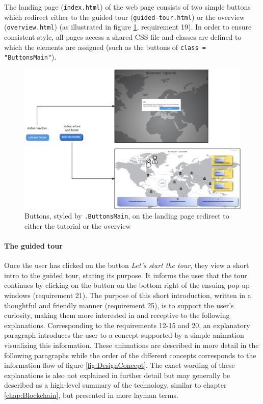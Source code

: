 The landing page (\texttt{index.html}) of the web page consists of two simple buttons which redirect either to the guided tour (\texttt{guided-tour.html}) or the overview (\texttt{overview.html}) (as illustrated in figure \ref{fig:ButtonStyle}, requirement 19). In order to ensure consistent style, all pages access a shared \ac{CSS} file and classes are defined to which the elements are assigned (such as the buttons of \texttt{class = "ButtonsMain"}). 

\begin{figure}
    \centering
    \includegraphics[width=\textwidth]{latex-vorlage_v1.5/graphics/protoAll.png}
    \caption{Buttons, styled by \texttt{.ButtonsMain}, on the landing page redirect to either the tutorial or the overview}
    \label{fig:ButtonStyle}
\end{figure}

\paragraph{The guided tour} Once the user has clicked on the button \textit{Let's start the tour}, they view a short intro to the guided tour, stating its purpose. It informs the user that the tour continues by clicking on the button on the bottom right of the ensuing pop-up windows (requirement 21). The purpose of this short introduction, written in a thoughtful and friendly manner (requirement 25), is to support the user's curiosity, making them more interested in and receptive to the following explanations. Corresponding to the requirements 12-15 and 20, an explanatory paragraph introduces the user to a concept supported by a simple animation visualizing this information. These animations are described in more detail in the following paragraphs while the order of the different concepts corresponds to the information flow of figure \ref{fig:DesignConcept}. The exact wording of these explanations is also not explained in further detail but may generally be described as a high-level summary of the technology, similar to chapter \ref{chap:Blockchain}, but presented in more layman terms.

